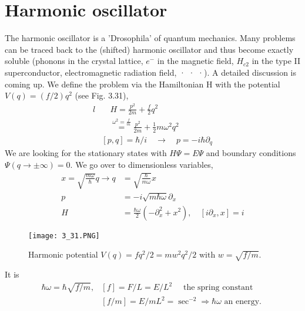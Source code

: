 \section{Harmonic oscillator}
The harmonic oscillator is a 'Drosophila' of quantum mechanics. Many problems can be traced back to the (shifted) harmonic oscillator and thus become exactly soluble (phonons in the crystal lattice, $e^-$ in the magnetic field, $H_{c2}$ in the type II superconductor, electromagnetic radiation field, · · ·). A detailed discussion is coming up. We define the problem via the Hamiltonian H with the potential $V (q) = (f / 2) q^2$ (see Fig. 3.31),
\begin{equation}
    \begin{split}{l} 
        &\quad H =\frac{p^{2}}{2 m}+\frac{f}{2} q^{2} \\ 
        &\quad \overset{\omega^{2} =\frac{f}{m}}{=}  \frac{p^{2}}{2 m}+\frac{1}{2} m \omega^{2} q^{2} \\
        &[p, q] =\hbar / i \quad \rightarrow \quad p=-i \hbar \partial_{q} 
    \end{split}
    \end{equation}
We are looking for the stationary states with $H\Psi = E\Psi$ and boundary conditions $\Psi(q\to\pm\infty)=0$. We go over to dimensionless variables,
\begin{equation}
\begin{aligned} x=\sqrt{\frac{m \omega}{\hbar}} q \rightarrow q &=\sqrt{\frac{\hbar}{m \omega}} x \\ p &=-i \sqrt{m \hbar \omega} \partial_{x} \\ H &=\frac{\hbar \omega}{2}\left(-\partial_{x}^{2}+x^{2}\right), \quad\left[i \partial_{x}, x\right]=i \end{aligned}
\end{equation}
\begin{figure}[ht]
    \begin{minipage}{0.5\textwidth}
        \centering
        \texttt{[image: 3\_31.PNG]}
    \end{minipage}
    \begin{minipage}{0.5\textwidth}
        \caption{Harmonic potential $V(q)=fq^2/2=mw^2q^2/2 \text{ with }w=\sqrt{f/m}$.}
    \end{minipage}
\end{figure}
It is
\begin{equation}
\begin{aligned} \hbar \omega=\hbar \sqrt{f / m}, &[f]=F / L=E / L^{2} \quad \text { the spring constant } \\ &[f / m]=E / m L^{2}=\sec ^{-2} \Rightarrow \hbar \omega \text { an energy. } \end{aligned}
\end{equation}
